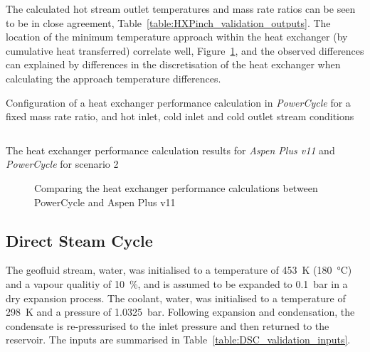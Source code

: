         The calculated hot stream outlet temperatures and mass rate ratios can be seen to be in close agreement, Table~\ref{table:HXPinch_validation_outputs}. The location of the minimum temperature approach within the heat exchanger (by cumulative heat transferred) correlate well, Figure~\ref{fig:Aspen_HXpinch_validation_plot}, and the observed differences can explained by differences in the discretisation of the heat exchanger when calculating the approach temperature differences.

        \begin{listing}[H]
            \caption{Configuration of a heat exchanger performance calculation in \emph{PowerCycle} for a fixed mass rate ratio, and hot inlet, cold inlet and cold outlet stream conditions}
            \inputminted[bgcolor=bg,linenos, fontsize=\footnotesize]{python}{Content/PowerCycle/Code/HeatExchangerPerf_Pinch_snippet.py}
            \label{lst:PC_HXpinch_validation}
            \vspace{-20pt}
        \end{listing}  

        \begin{table}[H]
            \caption{The heat exchanger performance calculation results for \emph{Aspen Plus v11} and \emph{PowerCycle} for scenario 2}
            \centering 
            \label{table:HXPinch_validation_outputs}
            
        \end{table}
        
        \begin{figure}[H]
            \centering
            
            \caption{Comparing the heat exchanger performance calculations between PowerCycle and Aspen Plus v11}
            \label{fig:Aspen_HXpinch_validation_plot}
        \end{figure}
        
    \subsection{Direct Steam Cycle}

        The geofluid stream, water, was initialised to a temperature of \qty{453}{\K} (\qty{180}{\degreeCelsius}) and a vapour qualitiy of \qty{10}{\percent}, and is assumed to be expanded to \qty{0.1}{\bar} in a dry expansion process. The coolant, water, was initialised to a temperature of \qty{298}{\K} and a pressure of \qty{1.0325}{\bar}. Following expansion and condensation, the condensate is re-pressurised to the inlet pressure and then returned to the reservoir. The inputs are summarised in Table~\ref{table:DSC_validation_inputs}.

